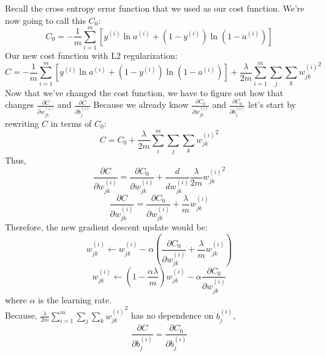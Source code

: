 \documentclass[11pt]{article}
\begin{document}
Recall the cross entropy error function that we used as our cost function. We're now going to call this $C_0$:
\[C_0 = - \frac{1}{m} \sum_{i = 1}^m \left[y^{(i)} \ln a^{(i)} + (1 - y^{(i)}) \ln \left(1 - a^{(i)}\right)\right]\]
Our new cost function with L2 regularization:
\[C = - \frac{1}{m} \sum_{i = 1}^m \left[y^{(i)} \ln a^{(i)} + (1 - y^{(i)}) \ln \left(1 - a^{(i)}\right)\right] + \frac{\lambda}{2m} \sum_{i = 1}^m \sum_j \sum_k {w_{jk}^{(i)}}^2\]
Now that we've changed the cost function, we have to figure out how that changes $\frac{\partial C}{\partial w_{jk}^{(i)}}$ and $\frac{\partial C}{\partial b_j^{(i)}}$ Because we already know $\frac{\partial C_0}{\partial w_{jk}^{(i)}}$ and $\frac{\partial C_0}{\partial b_j^{(i)}}$ let's start by rewriting $C$ in terms of $C_0$:
\[C = C_0 + \frac{\lambda}{2m} \sum_i^m \sum_j \sum_k {w_{jk}^{(i)}}^2\]
Thus,
\[\frac{\partial C}{\partial w_{jk}^{(i)}} = \frac{\partial C_0}{\partial w_{jk}^{(i)}} + \frac{d}{d w_{jk}^{(i)}} \frac{\lambda}{2m} {w_{jk}^{(i)}}^2\]
\[\frac{\partial C}{\partial w_{jk}^{(i)}} = \frac{\partial C_0}{\partial w_{jk}^{(i)}} + \frac{\lambda}{m} w_{jk}^{(i)}\]
Therefore, the new gradient descent update would be:
\[w_{jk}^{(i)} \leftarrow w_{jk}^{(i)} - \alpha \left( \frac{\partial C_0}{\partial w_{jk}^{(i)}} + \frac{\lambda}{m} w_{jk}^{(i)} \right)\]
\[w_{jk}^{(i)} \leftarrow \left( 1 - \frac{\alpha \lambda}{m} \right) w_{jk}^{(i)} - \alpha \frac{\partial C_0}{\partial w_{jk}^{(i)}}\]
where $\alpha$ is the learning rate. \\

Because, $\frac{\lambda}{2m} \sum\limits_{i = 1}^m \sum\limits_j \sum\limits_k {w_{jk}^{(i)}}^2$ has no dependence on $b_j^{(i)}$,
\[\frac{\partial C}{\partial b_j^{(i)}} = \frac{\partial C_0}{\partial b_j^{(i)}}\]
\end{document}
